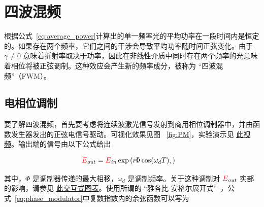 \chapter{四波混频}
\label{ch:FWM}

根据公式~\ref{eq:average_power}计算出的单一频率光的平均功率在一段时间内是恒定的。如果存在两个频率，它们之间的干涉会导致平均功率随时间正弦变化。由于 $\gamma\neq0$ 意味着折射率取决于功率，因此在非线性介质中同时存在两个频率的光意味着相位将被正弦调制。这种效应会产生新的频率成分，被称为 “四波混频”（FWM）。



\section{电相位调制}

要了解四波混频，首先要考虑将连续波激光信号发射到商用相位调制器中，并由函数发生器发出的正弦电信号驱动。可视化效果见图 ~\ref{fig:PM}，实验演示见 \href{https://youtu.be/j8It3to54AQ}{此视频}。输出端的信号由以下公式给出

\begin{align}
    \label{eq:phase_modulator}
    \textcolor{red}{E}_{out}&=\textcolor{red}{E}_{in}\exp\left(i\Phi\cos(\omega_dT), \right)
\end{align}

其中，$\Phi$ 是调制器传递的最大相移，$\omega_d$ 是调制频率。关于这种调制对 $\textcolor{red}{E}_{out}$ 实部的影响，请参见 \href{https://www.desmos.com/calculator/vcreo1gs2q}{此交互式图表}。使用所谓的 “雅各比-安格尔展开式”~\cite{NIST_JA_expansion}，公式~\ref{eq:phase_modulator}中复数指数内的余弦函数可以写为

